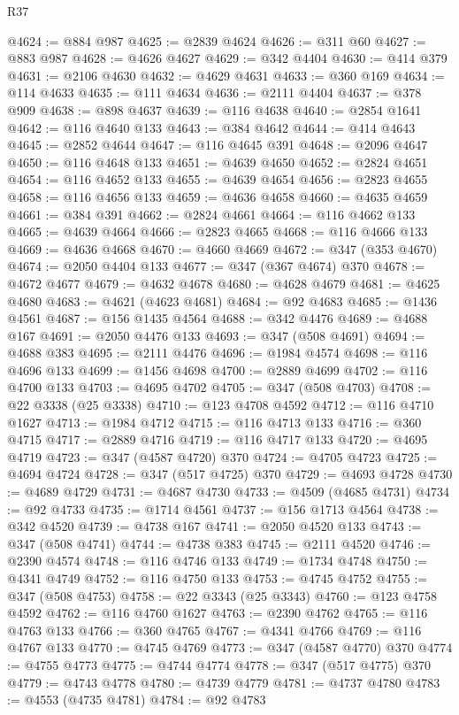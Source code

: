 \begin{lexlean}{R37}
\begin{coremodule}
@4624 := @884 @987
@4625 := @2839 @4624
@4626 := @311 @60
@4627 := @883 @987
@4628 := @4626 @4627
@4629 := @342 @4404
@4630 := @414 @379
@4631 := @2106 @4630
@4632 := @4629 @4631
@4633 := @360 @169
@4634 := @114 @4633
@4635 := @111 @4634
@4636 := @2111 @4404
@4637 := @378 @909
@4638 := @898 @4637
@4639 := @116 @4638
@4640 := @2854 @1641
@4642 := @116 @4640 @133
@4643 := @384 @4642
@4644 := @414 @4643
@4645 := @2852 @4644
@4647 := @116 @4645 @391
@4648 := @2096 @4647
@4650 := @116 @4648 @133
@4651 := @4639 @4650
@4652 := @2824 @4651
@4654 := @116 @4652 @133
@4655 := @4639 @4654
@4656 := @2823 @4655
@4658 := @116 @4656 @133
@4659 := @4636 @4658
@4660 := @4635 @4659
@4661 := @384 @391
@4662 := @2824 @4661
@4664 := @116 @4662 @133
@4665 := @4639 @4664
@4666 := @2823 @4665
@4668 := @116 @4666 @133
@4669 := @4636 @4668
@4670 := @4660 @4669
@4672 := @347 (@353 @4670)
@4674 := @2050 @4404 @133
@4677 := @347 (@367 @4674) @370
@4678 := @4672 @4677
@4679 := @4632 @4678
@4680 := @4628 @4679
@4681 := @4625 @4680
@4683 := @4621 (@4623 @4681)
@4684 := @92 @4683
@4685 := @1436 @4561
@4687 := @156 @1435 @4564
@4688 := @342 @4476
@4689 := @4688 @167
@4691 := @2050 @4476 @133
@4693 := @347 (@508 @4691)
@4694 := @4688 @383
@4695 := @2111 @4476
@4696 := @1984 @4574
@4698 := @116 @4696 @133
@4699 := @1456 @4698
@4700 := @2889 @4699
@4702 := @116 @4700 @133
@4703 := @4695 @4702
@4705 := @347 (@508 @4703)
@4708 := @22 @3338 (@25 @3338)
@4710 := @123 @4708 @4592
@4712 := @116 @4710 @1627
@4713 := @1984 @4712
@4715 := @116 @4713 @133
@4716 := @360 @4715
@4717 := @2889 @4716
@4719 := @116 @4717 @133
@4720 := @4695 @4719
@4723 := @347 (@4587 @4720) @370
@4724 := @4705 @4723
@4725 := @4694 @4724
@4728 := @347 (@517 @4725) @370
@4729 := @4693 @4728
@4730 := @4689 @4729
@4731 := @4687 @4730
@4733 := @4509 (@4685 @4731)
@4734 := @92 @4733
@4735 := @1714 @4561
@4737 := @156 @1713 @4564
@4738 := @342 @4520
@4739 := @4738 @167
@4741 := @2050 @4520 @133
@4743 := @347 (@508 @4741)
@4744 := @4738 @383
@4745 := @2111 @4520
@4746 := @2390 @4574
@4748 := @116 @4746 @133
@4749 := @1734 @4748
@4750 := @4341 @4749
@4752 := @116 @4750 @133
@4753 := @4745 @4752
@4755 := @347 (@508 @4753)
@4758 := @22 @3343 (@25 @3343)
@4760 := @123 @4758 @4592
@4762 := @116 @4760 @1627
@4763 := @2390 @4762
@4765 := @116 @4763 @133
@4766 := @360 @4765
@4767 := @4341 @4766
@4769 := @116 @4767 @133
@4770 := @4745 @4769
@4773 := @347 (@4587 @4770) @370
@4774 := @4755 @4773
@4775 := @4744 @4774
@4778 := @347 (@517 @4775) @370
@4779 := @4743 @4778
@4780 := @4739 @4779
@4781 := @4737 @4780
@4783 := @4553 (@4735 @4781)
@4784 := @92 @4783

\end{coremodule}
\end{lexlean}
